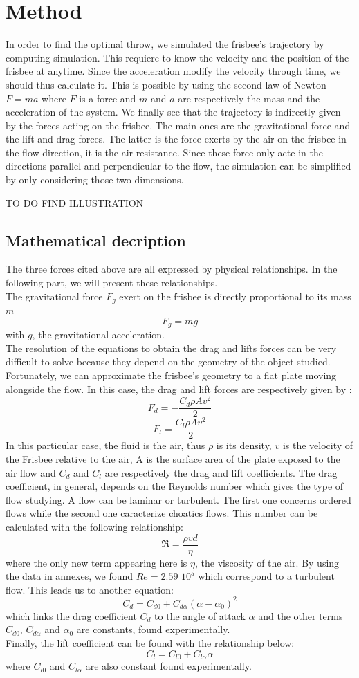 \documentclass[10pt,a4paper]{report}
\begin{document}
\section{Method}
In order to find the optimal throw, we simulated the frisbee's trajectory by computing simulation. This requiere to know the velocity and the position of the frisbee at anytime. Since the acceleration modify the velocity through time, we should thus calculate it. This is possible by using the second law of Newton $F = ma$ where $F$ is a force and $m$ and $a$ are respectively the mass and the acceleration of the system. We finally see that the trajectory is indirectly given by the forces acting on the frisbee. The main ones are the gravitational force and the lift and drag forces. The latter is the force exerts by the air on the frisbee in the flow direction, it is the air resistance. Since these force only acte in the directions parallel and perpendicular to the flow, the simulation can be simplified by only considering those two dimensions.

TO DO FIND ILLUSTRATION

\subsection{Mathematical decription}
The three forces cited above are all expressed by physical relationships. In the following part, we will present these relationships.
\\
The gravitational force $F_g$ exert on the frisbee is directly proportional to its mass $m$
\[F_g = m g\]
with $g$, the gravitational acceleration.
\\
The resolution of the equations to obtain the drag and lifts forces can be very difficult to solve because they depend on the geometry of the object studied. Fortunately, we can approximate the frisbee's geometry to a flat plate moving alongside the flow. In this case, the drag and lift forces are respectively given by :
\[F_d = -\frac{C_d \rho A  v^2}{2}\]
\[F_l = \frac{C_l \rho A  v^2}{2}\]
In this particular case, the fluid is the air, thus $\rho$ is its density, $v$ is the velocity of the Frisbee relative to the air, A is the surface area of the plate exposed to the air flow and $C_d$ and $C_l$ are respectively the drag and lift coefficients.
The drag coefficient, in general, depends on the Reynolds number which gives the type of flow studying. A flow can be laminar or turbulent. The first one concerns ordered flows while the second one caracterize choatics flows. This number can be calculated with the following relationship:
\[\Re = \frac{\rho v d}{\eta}\]
where the only new term appearing here is $\eta$, the viscosity of the air.
By using the data in annexes, we found $Re=2.59$ $10^5$ which correspond to a turbulent flow.
This leads us to another equation:
\[C_d = C_{d0} + C_{d\alpha}(\alpha-\alpha_0)^2\]
which links the drag coefficient $C_d$ to the angle of attack $\alpha$ and the other terms $C_{d0}$, $C_{d\alpha}$ and $\alpha_0$ are constants, found experimentally.
\\Finally, the lift coefficient can be found with the relationship below:
\[C_l = C_{l0} + C_{l \alpha} \alpha\]
where $C_{l0}$ and $C_{l\alpha}$ are also constant found experimentally.
\end{document}
